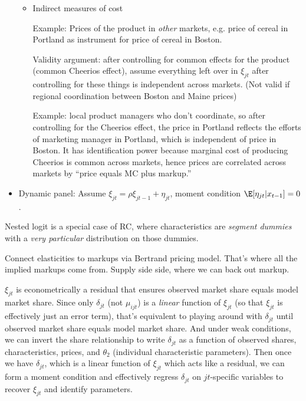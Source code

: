 \documentclass[12pt]{article}
\theoremstyle{plain}
\theoremstyle{definition}
\theoremstyle{remark}
\begin{document}
\begin{itemize}
\begin{itemize}
      \item Indirect measures of cost

        Example: Prices of the product in \emph{other} markets, e.g.
        price of cereal in Portland as instrument for price of cereal in
        Boston.

        Validity argument: after controlling for common effects for the
        product (common Cheerios effect), assume everything left over in
        $\xi_{jt}$ after controlling for these things is independent across
        markets.
        (Not valid if regional coordination between Boston and Maine prices)

        Example: local product managers who don't coordinate, so after
        controlling for the Cheerios effect, the price in Portland reflects
        the efforts of marketing manager in Portland, which is independent
        of price in Boston.
        It has identification power because marginal cost of producing
        Cheerios is common across markets, hence prices are correlated
        across markets by ``price equals MC plus markup.''
    \end{itemize}

  \item Dynamic panel:
    Assume $\xi_{jt}=\rho \xi_{jt-1}+\eta_{jt}$, moment condition
    $\E[\eta_{jt}|x_{t-1}]=0$.
\end{itemize}
Nested logit is a special case of RC, where characteristics are
\emph{segment dummies} with a \emph{very particular} distribution on
those dummies.

Connect elasticities to markups via Bertrand pricing model.
That's where all the implied markups come from.
Supply side side, where we can back out markup.


\clearpage
$\xi_{jt}$ is econometrically a residual that ensures observed market
share equals model market share.
Since only $\delta_{jt}$ (not $\mu_{ijt}$) is a \emph{linear} function
of $\xi_{jt}$ (so that $\xi_{jt}$ is effectively just an error term),
that's equivalent to playing around with $\delta_{jt}$ until observed
market share equals model market share.
And under weak conditions, we can invert the share relationship to write
$\delta_{jt}$ as a function of observed shares, characteristics, prices,
and $\theta_2$ (individual characteristic parameters).
Then once we have $\delta_{jt}$, which is a linear function of
$\xi_{jt}$ which acts like a residual, we can form a moment condition
and effectively regress $\delta_{jt}$ on $jt$-specific variables to
recover $\xi_{jt}$ and identify parameters.
\end{document}
